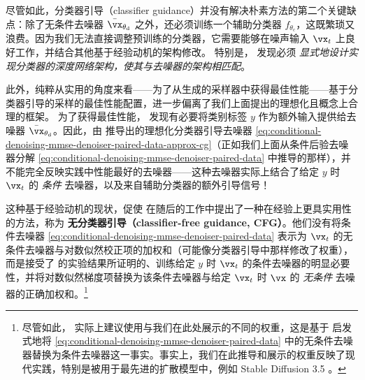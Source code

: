 \documentclass[../../book-main_zh.tex]{subfiles}
\begin{document}
尽管如此，分类器引导（classifier guidance）并没有解决朴素方法的第二个关键缺点：除了无条件去噪器 $\bar{\vx}_{\theta_{\mathrm{d}}}$ 之外，还必须训练一个辅助分类器 $f_{\theta_{\mathrm{c}}}$，这既繁琐又浪费。因为我们无法直接调整预训练的分类器，它需要能够在噪声输入 $\vx_t$ 上良好工作，并结合其他基于经验动机的架构修改。
特别是，\citet{Dhariwal2021-hg} 发现必须 \textit{显式地设计实现分类器的深度网络架构，使其与去噪器的架构相匹配}。

此外，纯粹从实用的角度来看——为了从生成的采样器中获得最佳性能——基于分类器引导的采样的最佳性能配置，进一步偏离了我们上面提出的理想化且概念上合理的框架。
为了获得最佳性能，\citet{Dhariwal2021-hg} 发现有必要将类别标签 $y$ 作为额外输入提供给去噪器 $\bar{\vx}_{\theta_{\mathrm{d}}}$。因此，由 \citet{Dhariwal2021-hg} 推导出的理想化分类器引导去噪器 \eqref{eq:conditional-denoising-mmse-denoiser-paired-data-approx-cg}（正如我们上面从条件后验去噪器分解 \eqref{eq:conditional-denoising-mmse-denoiser-paired-data} 中推导的那样），并不能完全反映实践中性能最好的去噪器——这种去噪器实际上结合了给定 $y$ 时 $\vx_t$ 的 \textit{条件} 去噪器，以及来自辅助分类器的额外引导信号！

这种基于经验动机的现状，促使 \citet{Ho2022-ry} 在随后的工作中提出了一种在经验上更具实用性的方法，称为 \textbf{无分类器引导（classifier-free guidance, CFG）}。他们没有将条件去噪器 \eqref{eq:conditional-denoising-mmse-denoiser-paired-data} 表示为 $\vx_t$ 的无条件去噪器与对数似然校正项的加权和（可能像分类器引导中那样修改了权重），而是接受了 \citet{Dhariwal2021-hg} 的实验结果所证明的、训练给定 $y$ 时 $\vx_t$ 的条件去噪器的明显必要性，并将对数似然梯度项替换为该条件去噪器与给定 $\vx_t$ 时 $\vx$ 的 \textit{无条件} 去噪器的正确加权和。\footnote{尽管如此，\textcite{Ho2022-ry} 实际上建议使用与我们在此处展示的不同的权重，这是基于 \textcite{Dhariwal2021-hg} 启发式地将 \eqref{eq:conditional-denoising-mmse-denoiser-paired-data} 中的无条件去噪器替换为条件去噪器这一事实。事实上，我们在此推导和展示的权重反映了现代实践，特别是被用于最先进的扩散模型中，例如 Stable Diffusion 3.5 \cite{DBLP:conf/icml/EsserKBEMSLLSBP24}。}
\end{document}
